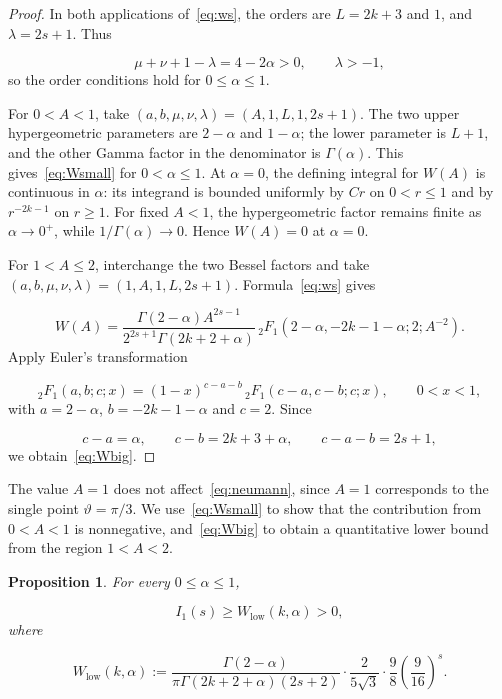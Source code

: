 \documentclass[11pt]{article}
\theoremstyle{plain}
\newtheorem{proposition}[theorem]{Proposition}
\theoremstyle{definition}
\theoremstyle{remark}
\begin{document}
\begin{proof}
In both applications of~\eqref{eq:ws}, the orders are $L = 2k+3$ and $1$, and $\lambda = 2s+1$. Thus

\[
  \mu + \nu + 1 - \lambda = 4 - 2\alpha > 0 , \qquad  \lambda > -1 ,
\]
so the order conditions hold for $0 \le \alpha \le 1$.

For $0 < A < 1$, take $(a,b,\mu ,\nu ,\lambda ) = (A, 1, L, 1, 2s+1)$. The two upper hypergeometric parameters are $2-\alpha$ and $1-\alpha$; the lower parameter is $L+1$, and the other Gamma factor in the denominator is $\Gamma (\alpha )$. This gives~\eqref{eq:Wsmall} for $0 < \alpha \le 1$. At $\alpha = 0$, the defining integral for $W(A)$ is continuous in $\alpha$: its integrand is bounded uniformly by $Cr$ on $0 < r \le 1$ and by $r^{-2k-1}$ on $r \ge 1$. For fixed $A < 1$, the hypergeometric factor remains finite as $\alpha \to 0^{+}$, while $1/\Gamma (\alpha ) \to 0$. Hence $W(A) = 0$ at $\alpha = 0$.

For $1 < A \le 2$, interchange the two Bessel factors and take $(a,b,\mu ,\nu ,\lambda ) = (1, A, 1, L, 2s+1)$. Formula~\eqref{eq:ws} gives

\[
  W(A) = \frac{\Gamma (2-\alpha )A^{2s-1}}{2^{2s+1}\Gamma (2k+2+\alpha )}\, {}_{2}F_{1}\left( 2-\alpha , -2k-1-\alpha ; 2; A^{-2} \right) .
\]
Apply Euler's transformation~\cite[Eq.~15.8.1]{r1}

\[
  {}_{2}F_{1}(a,b;c;x) = (1-x)^{c-a-b}\, {}_{2}F_{1}(c-a, c-b; c; x) , \qquad  0 < x < 1 ,
\]
with $a = 2-\alpha$, $b = -2k-1-\alpha$ and $c = 2$. Since

\[
  c - a = \alpha , \qquad  c - b = 2k+3+\alpha , \qquad  c - a - b = 2s+1 ,
\]
we obtain~\eqref{eq:Wbig}.
\end{proof}

The value $A = 1$ does not affect~\eqref{eq:neumann}, since $A = 1$ corresponds to the single point $\vartheta = \pi /3$. We use~\eqref{eq:Wsmall} to show that the contribution from $0 < A < 1$ is nonnegative, and~\eqref{eq:Wbig} to obtain a quantitative lower bound from the region $1 < A < 2$.

\begin{proposition}\label{res:4.3}
For every $0 \le \alpha \le 1$,

\begin{equation}\label{eq:Wlowbound}
  I_{1}(s) \ge W_{\mathrm{low}}(k,\alpha ) > 0 ,
\end{equation}
where

\begin{equation}\label{eq:Wlowdef}
  W_{\mathrm{low}}(k,\alpha ) := \frac{\Gamma (2-\alpha )}{\pi \Gamma (2k+2+\alpha )(2s+2)} \cdot \frac{2}{5\sqrt{3}} \cdot \frac{9}{8} \left( \frac{9}{16} \right)^{s} .
\end{equation}
\end{proposition}
\end{document}
